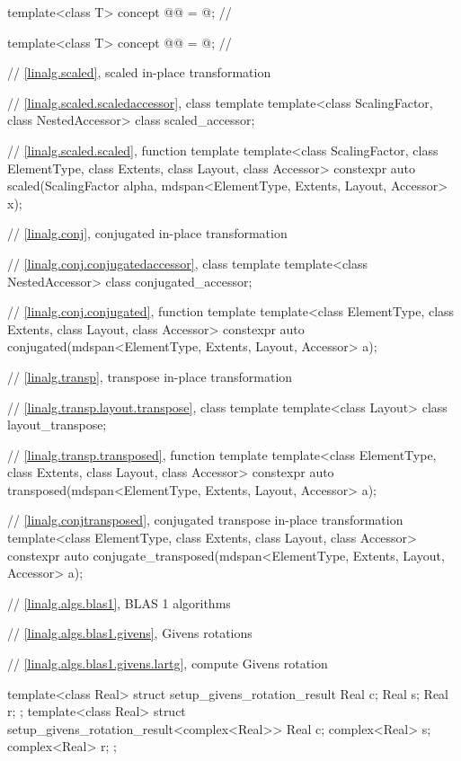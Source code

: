 \begin{codeblock}
{  template<class T>
    concept @@ = @\seebelow@;                   // \expos

  template<class T>
    concept @@ = @\seebelow@;                         // \expos

  // \ref{linalg.scaled}, scaled in-place transformation

  // \ref{linalg.scaled.scaledaccessor}, class template 
  template<class ScalingFactor, class NestedAccessor>
    class scaled_accessor;

  // \ref{linalg.scaled.scaled}, function template 
  template<class ScalingFactor,
           class ElementType, class Extents, class Layout, class Accessor>
    constexpr auto scaled(ScalingFactor alpha, mdspan<ElementType, Extents, Layout, Accessor> x);

  // \ref{linalg.conj}, conjugated in-place transformation

  // \ref{linalg.conj.conjugatedaccessor}, class template 
  template<class NestedAccessor>
    class conjugated_accessor;

  // \ref{linalg.conj.conjugated}, function template 
  template<class ElementType, class Extents, class Layout, class Accessor>
    constexpr auto conjugated(mdspan<ElementType, Extents, Layout, Accessor> a);

  // \ref{linalg.transp}, transpose in-place transformation

  // \ref{linalg.transp.layout.transpose}, class template 
  template<class Layout>
    class layout_transpose;

  // \ref{linalg.transp.transposed}, function template 
  template<class ElementType, class Extents, class Layout, class Accessor>
    constexpr auto transposed(mdspan<ElementType, Extents, Layout, Accessor> a);

  // \ref{linalg.conjtransposed}, conjugated transpose in-place transformation
  template<class ElementType, class Extents, class Layout, class Accessor>
    constexpr auto conjugate_transposed(mdspan<ElementType, Extents, Layout, Accessor> a);

  // \ref{linalg.algs.blas1}, BLAS 1 algorithms

  // \ref{linalg.algs.blas1.givens}, Givens rotations

  // \ref{linalg.algs.blas1.givens.lartg}, compute Givens rotation

  template<class Real>
  struct setup_givens_rotation_result {
    Real c;
    Real s;
    Real r;
  };
  template<class Real>
  struct setup_givens_rotation_result<complex<Real>> {
    Real c;
    complex<Real> s;
    complex<Real> r;
  };

}
\end{codeblock}

